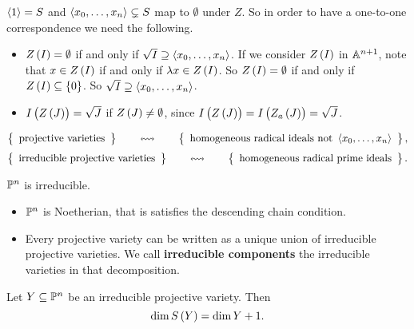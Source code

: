 \begin{note*}
$ \abr{1} = S $ and $ \abr{x_0, \dots, x_n} \subsetneq S $ map to $ \emptyset $ under $ Z $. So in order to have a one-to-one correspondence we need the following.
\begin{itemize}
\item $ Z\br{I} = \emptyset $ if and only if $ \sqrt{I} \supseteq \abr{x_0, \dots, x_n} $. If we consider $ Z\br{I} $ in $ \AA^{n + 1} $, note that $ x \in Z\br{I} $ if and only if $ \lambda x \in Z\br{I} $. So $ Z\br{I} = \emptyset $ if and only if $ Z\br{I} \subseteq \cbr{0} $. So $ \sqrt{I} \supseteq \abr{x_0, \dots, x_n} $.
\item $ I\br{Z\br{J}} = \sqrt{J} $ if $ Z\br{J} \ne \emptyset $, since $ I\br{Z\br{J}} = I\br{Z_a\br{J}} = \sqrt{J} $.
\end{itemize}
\end{note*}

\pagebreak

\begin{corollary}
$$ \correspondence{\text{projective varieties}}{\text{homogeneous radical ideals not} \ \abr{x_0, \dots, x_n}}, $$
$$ \correspondence{\text{irreducible projective varieties}}{\text{homogeneous radical prime ideals}}. $$
\end{corollary}

\begin{example}
$ \PP^n $ is irreducible.
\end{example}

\begin{proposition}
\hfill
\begin{itemize}
\item $ \PP^n $ is Noetherian, that is satisfies the descending chain condition.
\item Every projective variety can be written as a unique union of irreducible projective varieties. We call \textbf{irreducible components} the irreducible varieties in that decomposition.
\end{itemize}
\end{proposition}

\begin{theorem}
Let $ Y \subseteq \PP^n $ be an irreducible projective variety. Then
$$ \dim S\br{Y} = \dim Y + 1. $$
\end{theorem}

